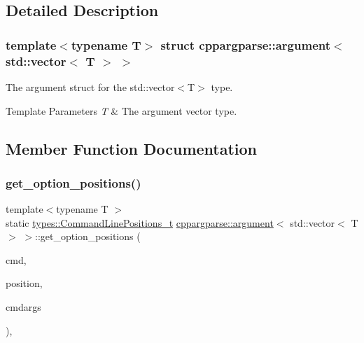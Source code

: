 \subsection{Detailed Description}
\subsubsection*{template$<$typename T$>$\newline
struct cppargparse\+::argument$<$ std\+::vector$<$ T $>$ $>$}

The argument struct for the std\+::vector$<$\+T$>$ type. 


\begin{DoxyTemplParams}{Template Parameters}
{\em T} & The argument vector type. \\
\hline
\end{DoxyTemplParams}


\subsection{Member Function Documentation}
\mbox{\label{structcppargparse_1_1argument_3_01std_1_1vector_3_01T_01_4_01_4_a57aaaece7f0d299010f47a9bbfbe5e70}} 
\subsubsection{\texorpdfstring{get\+\_\+option\+\_\+positions()}{get\_option\_positions()}}
{\footnotesize\ttfamily template$<$typename T $>$ \\
static \hyperlink{types_8h_a96efcf8a8929cc8e503e27b180627140}{types\+::\+Command\+Line\+Positions\+\_\+t} \hyperlink{structcppargparse_1_1argument}{cppargparse\+::argument}$<$ std\+::vector$<$ T $>$ $>$\+::get\+\_\+option\+\_\+positions (\begin{DoxyParamCaption}\item[{const \hyperlink{types_8h_a80adf2418b7ce9fe616698efa7533ecf}{types\+::\+Command\+Line\+\_\+t} \&}]{cmd,  }\item[{const \hyperlink{types_8h_a43b4f43f8940de1bf09ced6f1b668053}{types\+::\+Command\+Line\+Position\+\_\+t} \&}]{position,  }\item[{const \hyperlink{types_8h_a003c660afe2ee9c6cc39aea966e8926d}{types\+::\+Command\+Line\+Arguments\+\_\+t} \&}]{cmdargs }\end{DoxyParamCaption})\hspace{0.3cm}{\ttfamily [inline]}, {\ttfamily [static]}}



